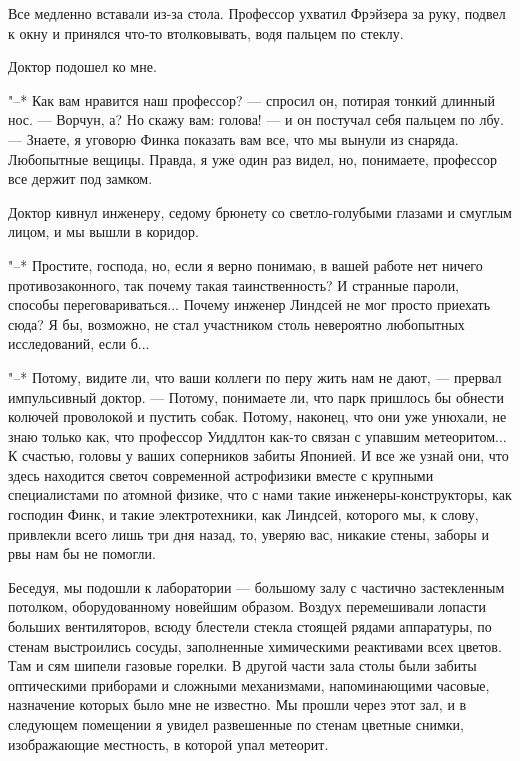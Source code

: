 Все медленно вставали из-за стола. Профессор ухватил Фрэйзера за  руку,
подвел к окну и принялся что-то втолковывать, водя пальцем по стеклу.

Доктор подошел ко мне.

"--* Как вам нравится наш профессор? --- спросил он, потирая тонкий  длинный
нос. --- Ворчун, а? Но скажу вам: голова! --- и он постучал  себя  пальцем  по
лбу. --- Знаете, я уговорю Финка показать вам все, что мы вынули из снаряда.
Любопытные вещицы. Правда, я уже один раз видел, но, понимаете,  профессор
все держит под замком.

Доктор кивнул инженеру, седому брюнету  со  светло-голубыми  глазами  и
смуглым лицом, и мы вышли в коридор.

"--* Простите, господа, но, если я  верно  понимаю,  в  вашей  работе  нет
ничего противозаконного,  так  почему  такая  таинственность?  И  странные
пароли, способы переговариваться... Почему инженер Линдсей не  мог  просто
приехать сюда?  Я  бы,  возможно,  не  стал  участником  столь  невероятно
любопытных исследований, если б...

"--* Потому, видите ли, что ваши коллеги по  перу  жить  нам  не  дают,  ---
прервал импульсивный доктор. --- Потому, понимаете ли, что парк пришлось  бы
обнести колючей проволокой и пустить собак. Потому, наконец, что  они  уже
унюхали, не знаю только  как,  что  профессор  Уиддлтон  как-то  связан  с
упавшим метеоритом... К счастью, головы у ваших соперников забиты Японией.
И все же узнай они, что здесь  находится  светоч  современной  астрофизики
вместе с крупными специалистами  по  атомной  физике,  что  с  нами  такие
инженеры-конструкторы, как господин  Финк,  и  такие  электротехники,  как
Линдсей, которого мы, к слову, привлекли всего лишь  три  дня  назад,  то,
уверяю вас, никакие стены, заборы и рвы нам бы не помогли.

Беседуя,  мы  подошли  к  лаборатории  ---  большому  залу   с   частично
застекленным   потолком,   оборудованному   новейшим    образом.    Воздух
перемешивали лопасти больших вентиляторов, всюду блестели  стекла  стоящей
рядами аппаратуры, по стенам выстроились сосуды,  заполненные  химическими
реактивами всех цветов. Там и сям шипели газовые горелки. В  другой  части
зала столы были  забиты  оптическими  приборами  и  сложными  механизмами,
напоминающими часовые, назначение которых было мне не известно. Мы  прошли
через этот зал, и в следующем помещении я  увидел  развешенные  по  стенам
цветные снимки, изображающие местность, в которой упал метеорит.

